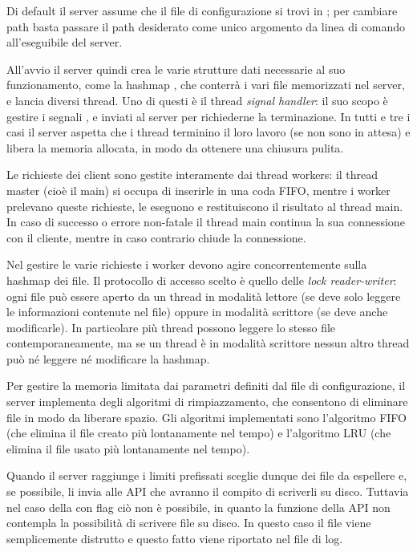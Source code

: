 \documentclass[11pt,oneface]{article}
\begin{document}
Di default il server assume che il file di configurazione si trovi in ; per cambiare path basta passare il path desiderato come unico argomento da linea di comando all'eseguibile del server.

All'avvio il server quindi crea le varie strutture dati necessarie al suo funzionamento, come la hashmap , che conterrà i vari file memorizzati nel server, e lancia diversi thread. Uno di questi è il thread \emph{signal handler}: il suo scopo è gestire i segnali ,  e  inviati al server per richiederne la terminazione. In tutti e tre i casi il server aspetta che i thread terminino il loro lavoro (se non sono in attesa) e libera la memoria allocata, in modo da ottenere una chiusura pulita. 

Le richieste dei client sono gestite interamente dai thread workers: il thread master (cioè il main) si occupa di inserirle in una coda FIFO, mentre i worker prelevano queste richieste, le eseguono e restituiscono il risultato al thread main. In caso di successo o errore non-fatale il thread main continua la sua connessione con il cliente, mentre in caso contrario chiude la connessione.

Nel gestire le varie richieste i worker devono agire concorrentemente sulla hashmap dei file. Il protocollo di accesso scelto è quello delle \emph{lock reader-writer}: ogni file può essere aperto da un thread in modalità lettore (se deve solo leggere le informazioni contenute nel file) oppure in modalità scrittore (se deve anche modificarle). In particolare più thread possono leggere lo stesso file contemporaneamente, ma se un thread è in modalità scrittore nessun altro thread può né leggere né modificare la hashmap.

Per gestire la memoria limitata dai parametri definiti dal file di configurazione, il server implementa degli algoritmi di rimpiazzamento, che consentono di eliminare file in modo da liberare spazio. Gli algoritmi implementati sono l'algoritmo FIFO (che elimina il file creato più lontanamente nel tempo) e l'algoritmo LRU (che elimina il file usato più lontanamente nel tempo).

Quando il server raggiunge i limiti prefissati sceglie dunque dei file da espellere e, se possibile, li invia alle API che avranno il compito di scriverli su disco.
Tuttavia nel caso della  con flag  ciò non è possibile, in quanto la funzione della API non contempla la possibilità di scrivere file su disco. In questo caso il file viene semplicemente distrutto e questo fatto viene riportato nel file di log. 
\end{document}
